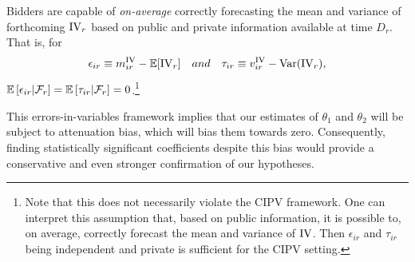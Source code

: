 \begin{assump}
    Bidders are capable of \emph{on-average} correctly forecasting the mean and variance of forthcoming $\mathrm{IV}_r$ based on public and private information available at time $D_r$. That is, for \[
         \epsilon_{ir} \equiv m^{\mathrm{IV}}_{ir} - \mathbb{E}[\mathrm{IV}_r] \quad and \quad \tau_{ir} \equiv v^{\mathrm{IV}}_{ir} - \mathrm{Var}(\mathrm{IV}_r),
    \] \( \mathbb{E} \left[ \epsilon_{ir} | \mathcal F_r \right] = \mathbb{E} \left[ \tau_{ir} | \mathcal F_r\right] = 0\).\footnote{Note that this does not necessarily violate the CIPV framework. One can interpret this assumption that, based on public information, it is possible to, on average, correctly forecast the mean and variance of $\mathrm{IV}$. Then $\epsilon_{ir}$ and $\tau_{ir}$ being independent and private is sufficient for the CIPV setting.} %
\end{assump}
\noindent This errors-in-variables framework implies that our estimates of $\theta_1$ and $\theta_2$ will be subject to attenuation bias, which will bias them towards zero. Consequently, finding statistically significant coefficients despite this bias would provide a conservative and even stronger confirmation of our hypotheses.

